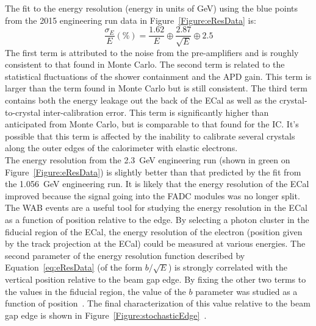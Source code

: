 The fit to the energy resolution (energy in units of GeV) using the blue points from the 2015 engineering run data in Figure~\ref{Figure:eResData} is:\\
\begin{equation}
	\label{eq:eResData}
	\dfrac{\sigma_E}{E}(\%) = \dfrac{1.62}{E}\oplus\dfrac{2.87}{\sqrt{E}}\oplus2.5
\end{equation}
The first term is attributed to the noise from the pre-amplifiers and is roughly consistent to that found in Monte Carlo. The second term is related to the statistical fluctuations of the shower containment and the APD gain. This term is larger than the term found in Monte Carlo but is still consistent. The third term contains both the energy leakage out the back of the ECal as well as the crystal-to-crystal inter-calibration error. This term is significantly higher than anticipated from Monte Carlo, but is comparable to that found for the IC. It's possible that this term is affected by the inability to calibrate several crystals along the outer edges of the calorimeter with elastic electrons. \\
\indent The energy resolution from the 2.3~GeV engineering run (shown in green on Figure~\ref{Figure:eResData}) is slightly better than that predicted by the fit from the 1.056~GeV engineering run. It is likely that the energy resolution of the ECal improved because the signal going into the FADC modules was no longer split. \\
\indent The WAB events are a useful tool for studying the energy resolution in the ECal as a function of position relative to the edge. By selecting a photon cluster in the fiducial region of the ECal, the energy resolution of the electron (position given by the track projection at the ECal) could be measured at various energies. The second parameter of the energy resolution function described by Equation~\eqref{eq:eResData} (of the form $b/\sqrt{E}$) is strongly correlated with the vertical position relative to the beam gap edge. By fixing the other two terms to the values in the fiducial region, the value of the $b$ parameter was studied as a function of position~\cite{szumila-vance_hps_2016}. The final characterization of this value relative to the beam gap edge is shown in Figure~\ref{Figure:stochasticEdge}~\cite{balossino_hps_2016}.

